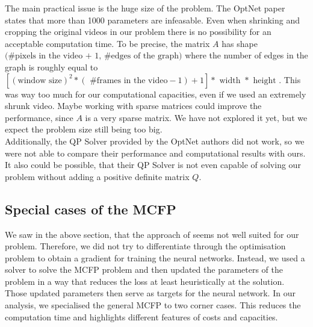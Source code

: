 \documentclass{article}
\begin{document}
{The main practical issue is the huge size of the problem. The OptNet paper states that more than 1000 parameters are infeasable. Even when shrinking and cropping the original videos in our problem there is no possibility for an acceptable computation time. To be precise, the matrix $A$ has shape $ \big(\text{\# pixels in the video + 1, \# edges of the graph}\big)$
where the number of edges in the graph is roughly equal to $[(\text{window size})^2  * (\text{ \# frames in the video}-1) + 1]* \text{ width } * \text{ height }.$ This was way too much for our computational capacities, even if we used an extremely shrunk video. 
Maybe working with sparse matrices could improve the performance, since $A$ is a very sparse matrix. We have not explored it yet, but we expect the problem size still being too big.\\
Additionally, the QP Solver provided by the OptNet authors did not work, so we were not able to compare their performance and computational results with ours. It also could be possible, that their QP Solver is not even capable of solving our problem without adding a positive definite matrix $Q$.

\subsection{Special cases of the MCFP}\label{specialMCFP}
We saw in the above section, that the approach of \cite{AmosK17} seems not well suited for our problem. Therefore, we did not try to differentiate through the optimisation problem to obtain a gradient for training the neural networks. Instead, we used a solver to solve the MCFP problem and then updated the parameters of the problem in a way that reduces the loss at least heuristically at the solution. Those updated parameters then serve as targets for the neural network. In our analysis, we specialised the general MCFP to two corner cases. This reduces the computation time and highlights different features of costs and capacities.


}
\end{document}
